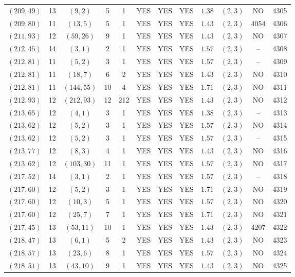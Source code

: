 \begin{longtable}{|c|c|c|c|c|c|c|c|c|c|c|c|}
$(209,49)$ & 13 & $(9,2)$ & 5 & 1 & YES & YES & YES & $1.38$ & $(2,3)$ & NO & 4305\\
$(209,80)$ & 11 & $(13,5)$ & 5 & 1 & YES & YES & YES & $1.43$ & $(2,3)$ & 4054 & 4306\\
$(211,93)$ & 12 & $(59,26)$ & 9 & 1 & YES & YES & YES & $1.43$ & $(2,3)$ & NO & 4307\\
$(212,45)$ & 14 & $(3,1)$ & 2 & 1 & YES & YES & YES & $1.57$ & $(2,3)$ & -- & 4308\\
$(212,81)$ & 11 & $(5,2)$ & 3 & 1 & YES & YES & YES & $1.57$ & $(2,3)$ & -- & 4309\\
$(212,81)$ & 11 & $(18,7)$ & 6 & 2 & YES & YES & YES & $1.43$ & $(2,3)$ & NO & 4310\\
$(212,81)$ & 11 & $(144,55)$ & 10 & 4 & YES & YES & YES & $1.71$ & $(2,3)$ & NO & 4311\\
$(212,93)$ & 12 & $(212,93)$ & 12 & 212 & YES & YES & YES & $1.43$ & $(2,3)$ & NO & 4312\\
$(213,65)$ & 12 & $(4,1)$ & 3 & 1 & YES & YES & YES & $1.38$ & $(2,3)$ & -- & 4313\\
$(213,62)$ & 12 & $(5,2)$ & 3 & 1 & YES & YES & YES & $1.57$ & $(2,3)$ & NO & 4314\\
$(213,62)$ & 12 & $(5,2)$ & 3 & 1 & YES & YES & YES & $1.57$ & $(2,3)$ & -- & 4315\\
$(213,77)$ & 12 & $(8,3)$ & 4 & 1 & YES & YES & YES & $1.43$ & $(2,3)$ & NO & 4316\\
$(213,62)$ & 12 & $(103,30)$ & 11 & 1 & YES & YES & YES & $1.57$ & $(2,3)$ & NO & 4317\\
$(217,52)$ & 14 & $(3,1)$ & 2 & 1 & YES & YES & YES & $1.57$ & $(2,3)$ & -- & 4318\\
$(217,60)$ & 12 & $(5,2)$ & 3 & 1 & YES & YES & YES & $1.71$ & $(2,3)$ & NO & 4319\\
$(217,60)$ & 12 & $(10,3)$ & 5 & 1 & YES & YES & YES & $1.57$ & $(2,3)$ & NO & 4320\\
$(217,60)$ & 12 & $(25,7)$ & 7 & 1 & YES & YES & YES & $1.71$ & $(2,3)$ & NO & 4321\\
$(217,45)$ & 13 & $(53,11)$ & 10 & 1 & YES & YES & YES & $1.43$ & $(2,3)$ & 4207 & 4322\\
$(218,47)$ & 13 & $(6,1)$ & 5 & 2 & YES & YES & YES & $1.43$ & $(2,3)$ & NO & 4323\\
$(218,57)$ & 13 & $(23,6)$ & 8 & 1 & YES & YES & YES & $1.57$ & $(2,3)$ & NO & 4324\\
$(218,51)$ & 13 & $(43,10)$ & 9 & 1 & YES & YES & YES & $1.43$ & $(2,3)$ & NO & 4325\\

\end{longtable}
